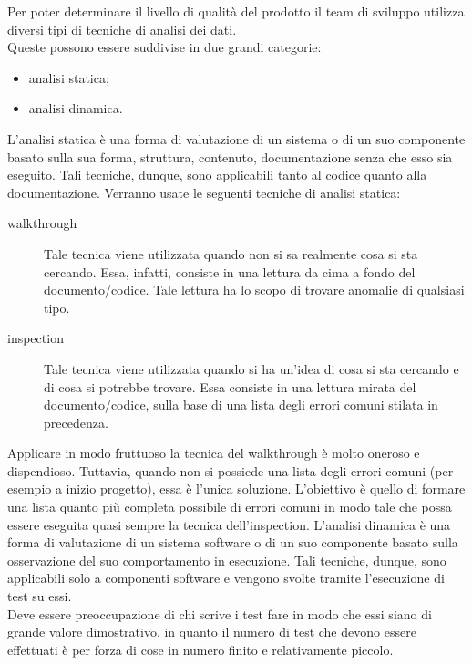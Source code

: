 			Per poter determinare il livello di qualità del prodotto il team di sviluppo utilizza diversi tipi di tecniche di analisi dei dati.\\
			Queste possono essere suddivise in due grandi categorie:
			\begin{itemize}
				\item analisi statica;
				\item analisi dinamica.
			\end{itemize}
				L'analisi statica è una forma di valutazione di un sistema o di un suo componente basato sulla sua forma, struttura, contenuto, documentazione senza che esso sia eseguito. Tali tecniche, dunque, sono applicabili tanto al codice quanto alla documentazione.
				Verranno usate le seguenti tecniche di analisi statica:
				\begin{description}
					\item[walkthrough] Tale tecnica viene utilizzata quando non si sa realmente cosa si sta cercando. Essa, infatti, consiste in una lettura da cima a fondo del documento/codice. Tale lettura ha lo scopo di trovare anomalie di qualsiasi tipo.
					\item[inspection] Tale tecnica viene utilizzata quando si ha un'idea di cosa si sta cercando e di cosa si potrebbe trovare. Essa consiste in una lettura mirata del documento/codice, sulla base di una lista degli errori comuni stilata in precedenza.
				\end{description}
				Applicare in modo fruttuoso la tecnica del walkthrough è molto oneroso e dispendioso. Tuttavia, quando non si possiede una lista degli	errori comuni (per esempio a inizio progetto), essa è l'unica soluzione. L'obiettivo è quello di formare una lista quanto più completa possibile di errori comuni in modo tale che possa essere eseguita quasi sempre la tecnica dell'inspection.
				L'analisi dinamica è una forma di valutazione di un sistema software o di un suo componente basato sulla osservazione del suo comportamento in esecuzione. Tali tecniche, dunque, sono applicabili solo a componenti software e vengono svolte tramite l'esecuzione di test su essi.\\
				Deve essere preoccupazione di chi scrive i test fare in modo che essi siano di grande valore dimostrativo, in quanto il numero di test che devono essere effettuati è per forza di cose in numero finito e relativamente piccolo.
